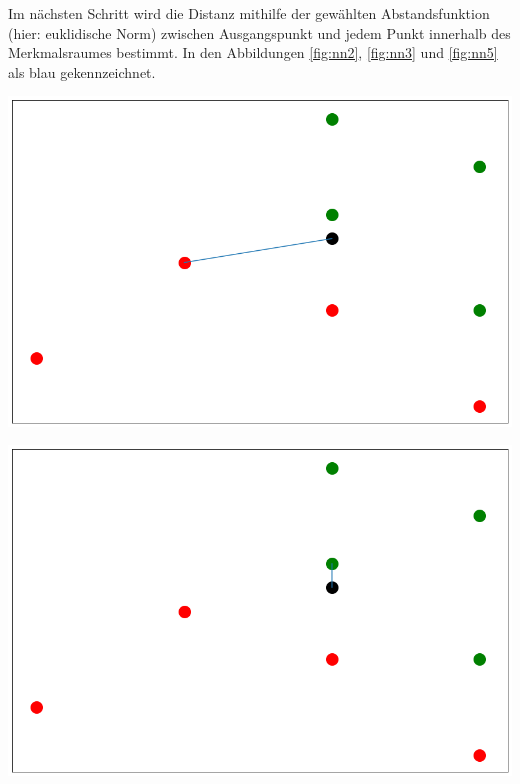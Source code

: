 \documentclass[fontsize=11pt]{scrartcl}
\newenvironment{Figure}
  {\par\medskip\noindent\minipage{\linewidth}}
  {\endminipage\par\medskip}
\begin{document}
                Im nächsten Schritt wird die Distanz mithilfe der gewählten Abstandsfunktion (hier: euklidische Norm) zwischen Ausgangspunkt und jedem Punkt innerhalb des Merkmalsraumes bestimmt. In den Abbildungen \ref{fig:nn2}, \ref{fig:nn3} und \ref{fig:nn5} als blau gekennzeichnet. 
                        
                
                \begin{Figure}
                    \begin{minipage}[b]{.4\linewidth}
                        \includegraphics[width=\linewidth]{nn3.png}
                        \label{fig:nn3}
                    \end{minipage}
                    \hspace*{.1\linewidth}
                    \begin{minipage}[b]{.4\linewidth}
                        \includegraphics[width=\linewidth]{nn5.png}
                        \label{fig:nn5}
                    \end{minipage}
                \end{Figure}        
                
\end{document}
